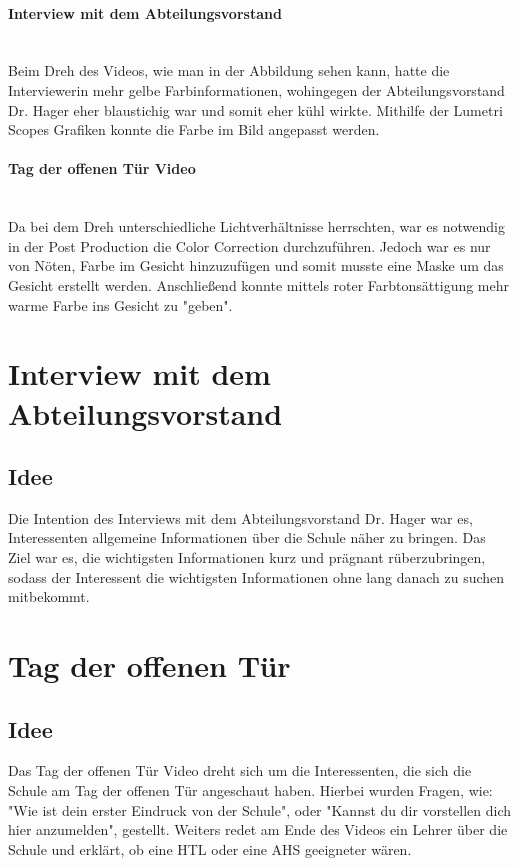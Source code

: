 \paragraph{Interview mit dem Abteilungsvorstand}
\leavevmode \\
Beim Dreh des Videos, wie man in der Abbildung sehen kann, hatte die Interviewerin mehr gelbe Farbinformationen, wohingegen der Abteilungsvorstand Dr. Hager eher blaustichig war und somit eher kühl wirkte. Mithilfe der Lumetri Scopes Grafiken konnte die Farbe im Bild angepasst werden.
\paragraph{Tag der offenen Tür Video}
\leavevmode \\
Da bei dem Dreh unterschiedliche Lichtverhältnisse herrschten, war es notwendig in der Post Production die Color Correction durchzuführen. Jedoch war es nur von Nöten, Farbe im Gesicht hinzuzufügen und somit musste eine Maske um das Gesicht erstellt werden. Anschließend konnte mittels roter Farbtonsättigung mehr warme Farbe ins Gesicht zu "geben".
\section{Interview mit dem Abteilungsvorstand}
\subsection{Idee}
Die Intention des Interviews mit dem Abteilungsvorstand Dr. Hager war es, Interessenten allgemeine Informationen über die Schule näher zu bringen. Das Ziel war es, die wichtigsten Informationen kurz und prägnant rüberzubringen, sodass der Interessent die wichtigsten Informationen ohne lang danach zu suchen mitbekommt.
\section{Tag der offenen Tür}
\subsection{Idee}
Das Tag der offenen Tür Video dreht sich um die Interessenten, die sich die Schule am Tag der offenen Tür angeschaut haben. Hierbei wurden Fragen, wie: "Wie ist dein erster Eindruck von der Schule", oder "Kannst du dir vorstellen dich hier anzumelden", gestellt. Weiters redet am Ende des Videos ein Lehrer über die Schule und erklärt, ob eine HTL oder eine AHS geeigneter wären.
